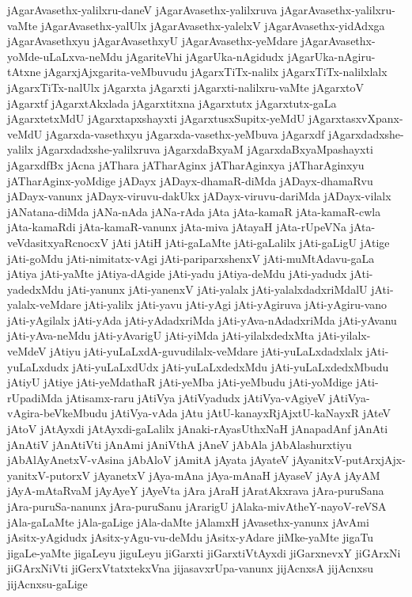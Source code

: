 {jAgarAvasethx-yalilxru-daneV
jAgarAvasethx-yalilxruva
jAgarAvasethx-yalilxru-vaMte
jAgarAvasethx-yalUlx
jAgarAvasethx-yalelxV
jAgarAvasethx-yidAdxga
jAgarAvasethxyu
jAgarAvasethxyU
jAgarAvasethx-yeMdare
jAgarAvasethx-yoMde-uLaLxva-neMdu
jAgariteVhi
jAgarUka-nAgidudx
jAgarUka-nAgiru-tAtxne
jAgarxjAjxgarita-veMbuvudu
jAgarxTiTx-nalilx
jAgarxTiTx-nalilxlalx
jAgarxTiTx-nalUlx
jAgarxta
jAgarxti
jAgarxti-nalilxru-vaMte
jAgarxtoV
jAgarxtf
jAgarxtAkxlada
jAgarxtitxna
jAgarxtutx
jAgarxtutx-gaLa
jAgarxtetxMdU
jAgarxtapxshayxti
jAgarxtusxSupitx-yeMdU
jAgarxtasxvXpanx-veMdU
jAgarxda-vasethxyu
jAgarxda-vasethx-yeMbuva
jAgarxdf
jAgarxdadxshe-yalilx
jAgarxdadxshe-yalilxruva
jAgarxdaBxyaM
jAgarxdaBxyaMpashayxti
jAgarxdfBx
jAcna
jAThara
jATharAginx
jATharAginxya
jATharAginxyu
jATharAginx-yoMdige
jADayx
jADayx-dhamaR-diMda
jADayx-dhamaRvu
jADayx-vanunx
jADayx-viruvu-dakUkx
jADayx-viruvu-dariMda
jADayx-vilalx
jANatana-diMda
jANa-nAda
jANa-rAda
jAta
jAta-kamaR
jAta-kamaR-cwla
jAta-kamaRdi
jAta-kamaR-vanunx
jAta-miva
jAtayaH
jAta-rUpeVNa
jAta-veVdasitxyaRcnocxV
jAti
jAtiH
jAti-gaLaMte
jAti-gaLalilx
jAti-gaLigU
jAtige
jAti-goMdu
jAti-nimitatx-vAgi
jAti-pariparxshenxV
jAti-muMtAdavu-gaLa
jAtiya
jAti-yaMte
jAtiya-dAgide
jAti-yadu
jAtiya-deMdu
jAti-yadudx
jAti-yadedxMdu
jAti-yanunx
jAti-yanenxV
jAti-yalalx
jAti-yalalxdadxriMdalU
jAti-yalalx-veMdare
jAti-yalilx
jAti-yavu
jAti-yAgi
jAti-yAgiruva
jAti-yAgiru-vano
jAti-yAgilalx
jAti-yAda
jAti-yAdadxriMda
jAti-yAva-nAdadxriMda
jAti-yAvanu
jAti-yAva-neMdu
jAti-yAvarigU
jAti-yiMda
jAti-yilalxdedxMta
jAti-yilalx-veMdeV
jAtiyu
jAti-yuLaLxdA-guvudilalx-veMdare
jAti-yuLaLxdadxlalx
jAti-yuLaLxdudx
jAti-yuLaLxdUdx
jAti-yuLaLxdedxMdu
jAti-yuLaLxdedxMbudu
jAtiyU
jAtiye
jAti-yeMdathaR
jAti-yeMba
jAti-yeMbudu
jAti-yoMdige
jAti-rUpadiMda
jAtisamx-raru
jAtiVya
jAtiVyadudx
jAtiVya-vAgiyeV
jAtiVya-vAgira-beVkeMbudu
jAtiVya-vAda
jAtu
jAtU-kanayxRjAjxtU-kaNayxR
jAteV
jAtoV
jAtAyxdi
jAtAyxdi-gaLalilx
jAnaki-rAyasUthxNaH
jAnapadAnf
jAnAti
jAnAtiV
jAnAtiVti
jAnAmi
jAniVthA
jAneV
jAbAla
jAbAlashurxtiyu
jAbAlAyAnetxV-vAsina
jAbAloV
jAmitA
jAyata
jAyateV
jAyanitxV-putArxjAjx-yanitxV-putorxV
jAyanetxV
jAya-mAna
jAya-mAnaH
jAyaseV
jAyA
jAyAM
jAyA-mAtaRvaM
jAyAyeY
jAyeVta
jAra
jAraH
jAratAkxrava
jAra-puruSana
jAra-puruSa-nanunx
jAra-puruSanu
jArarigU
jAlaka-mivAtheY-nayoV-reVSA
jAla-gaLaMte
jAla-gaLige
jAla-daMte
jAlamxH
jAvasethx-yanunx
jAvAmi
jAsitx-yAgidudx
jAsitx-yAgu-vu-deMdu
jAsitx-yAdare
jiMke-yaMte
jigaTu
jigaLe-yaMte
jigaLeyu
jiguLeyu
jiGarxti
jiGarxtiVtAyxdi
jiGarxnevxY
jiGArxNi
jiGArxNiVti
jiGerxVtatxtekxVna
jijasavxrUpa-vanunx
jijAcnxsA
jijAcnxsu
jijAcnxsu-gaLige
}
